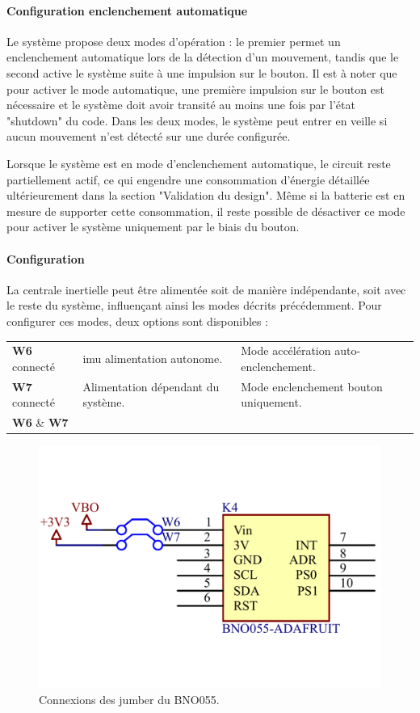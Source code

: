 \clearpage

\paragraph{Configuration enclenchement automatique}

Le système propose deux modes d'opération : le premier permet un enclenchement automatique lors de la détection d'un mouvement, tandis que le second active le système suite à une impulsion sur le bouton. Il est à noter que pour activer le mode automatique, une première impulsion sur le bouton est nécessaire et le système doit avoir transité au moins une fois par l'état "shutdown" du code. Dans les deux modes, le système peut entrer en veille si aucun mouvement n'est détecté sur une durée configurée.

Lorsque le système est en mode d'enclenchement automatique, le circuit reste partiellement actif, ce qui engendre une consommation d'énergie détaillée ultérieurement dans la section "Validation du design". Même si la batterie est en mesure de supporter cette consommation, il reste possible de désactiver ce mode pour activer le système uniquement par le biais du bouton.

\paragraph*{Configuration} La centrale inertielle peut être alimentée soit de manière indépendante, soit avec le reste du système, influençant ainsi les modes décrits précédemment. Pour configurer ces modes, deux options sont disponibles : \vspace*{+2mm}


\begin{tabular}{lll}
	\textbf{W6} connecté & \gls{imu} alimentation autonome. & Mode accélération auto-enclenchement. \\
	\textbf{W7} connecté & Alimentation dépendant du système. & Mode enclenchement bouton uniquement. \\
	\textbf{W6} \& \textbf{W7} & \color{red}{Connexion à éviter !} & \\
\end{tabular}

\begin{figure}[h]
	\centering
	\includegraphics[width=0.6\linewidth]{../figures/code/jumper-config-mode-IMU}
	\caption{Connexions des jumber du BNO055.}
	\label{fig:jumper-config-mode-imu}
\end{figure}

